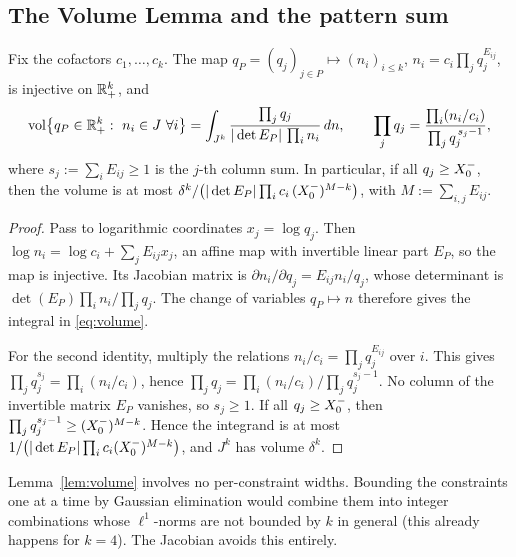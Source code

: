 \subsection{The Volume Lemma and the pattern sum}\label{sec:A-volume}

\begin{lemma}\label{lem:volume}
Fix the cofactors $c_1,\dots,c_k$. The map $q_P=(q_j)_{j\in P}\mapsto(n_i)_{i\le k}$, $n_i=c_i\prod_jq_j^{E_{ij}}$,
is injective on $\mathbb{R}_{+}^{k}$, and
\begin{equation}\label{eq:volume}
  \operatorname{vol}\bigl\{q_P\in\mathbb{R}_+^k:\ n_i\in J\ \forall i\bigr\}
  =\int_{J^k}\frac{\prod_jq_j}{|\det E_P|\,\prod_in_i}\,dn,
  \qquad
  \prod_jq_j=\frac{\prod_i(n_i/c_i)}{\prod_jq_j^{\,s_j-1}},
\end{equation}
where $s_j:=\sum_iE_{ij}\ge1$ is the $j$-th column sum. In particular, if all $q_j\ge X_0^{-}$, then the volume is at most
$\delta^k/\bigl(|\det E_P|\prod_ic_i\,(X_0^{-})^{M-k}\bigr)$, with $M:=\sum_{i,j}E_{ij}$.
\end{lemma}

\begin{proof}
Pass to logarithmic coordinates $x_j=\log q_j$. Then $\log n_i=\log c_i+\sum_jE_{ij}x_j$, an affine map with
invertible linear part $E_P$, so the map is injective. Its Jacobian matrix is $\partial n_i/\partial q_j=E_{ij}n_i/q_j$,
whose determinant is $\det(E_P)\prod_in_i/\prod_jq_j$. The change of variables $q_P\mapsto n$ therefore gives the
integral in \eqref{eq:volume}.

For the second identity, multiply the relations $n_i/c_i=\prod_jq_j^{E_{ij}}$ over $i$. This gives
$\prod_jq_j^{s_j}=\prod_i(n_i/c_i)$, hence $\prod_jq_j=\prod_i(n_i/c_i)\big/\prod_jq_j^{s_j-1}$. No column of the
invertible matrix $E_P$ vanishes, so $s_j\ge1$. If all $q_j\ge X_0^{-}$, then $\prod_jq_j^{s_j-1}\ge(X_0^{-})^{M-k}$. Hence the
integrand is at most $1/\bigl(|\det E_P|\prod_ic_i(X_0^{-})^{M-k}\bigr)$, and $J^k$ has volume $\delta^k$.
\end{proof}

\begin{remark}
Lemma~\ref{lem:volume} involves no per-constraint widths. Bounding the constraints one at a time by Gaussian elimination
would combine them into integer combinations whose $\ell^1$-norms are not bounded by $k$ in general (this already
happens for $k=4$). The Jacobian avoids this entirely.
\end{remark}

